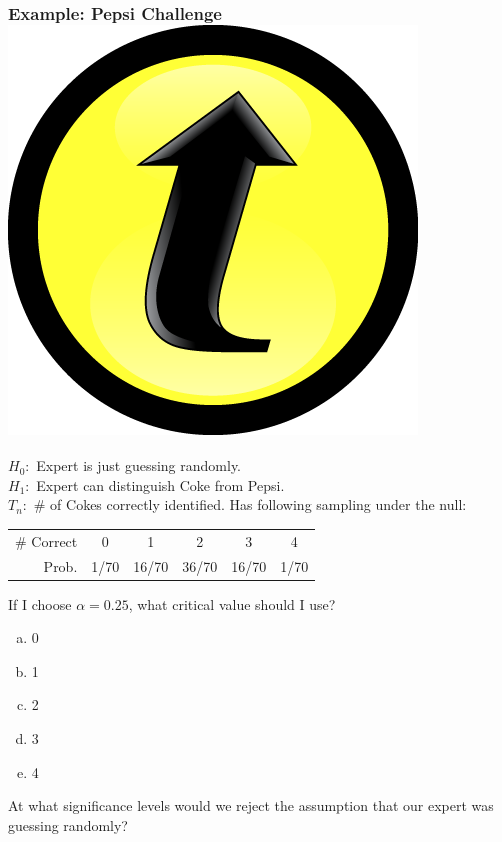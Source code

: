 \documentclass[handout]{beamer}
\begin{document}
\begin{frame}
\frametitle{Example: Pepsi Challenge \hfill \includegraphics[scale = 0.05]{./images/clicker}}
\footnotesize 
$H_0\colon$ Expert is just guessing randomly.\\
$H_1\colon$ Expert can distinguish Coke from Pepsi.\\
$T_n\colon$ \# of Cokes correctly identified. Has following sampling under the null:
		\begin{center}
		\begin{tabular}{rccccc}
		\hline \footnotesize
		\# Correct & 0 & 1 & 2 & 3 & 4\\
		Prob.&1/70 & 16/70 & 36/70 & 16/70 &1/70\\
		\hline
		\end{tabular}
	\end{center}
	\vspace{2em}
	\normalsize
	\alert{If I choose $\alpha =0.25$, what critical value should I use?}
	\begin{enumerate}[(a)]
		\item 0
		\item 1
		\item 2
		\item 3
		\item 4
	\end{enumerate}
\end{frame}
\begin{frame}
At what significance levels would we reject the assumption that our expert was guessing randomly?
\end{frame}
\end{document}
